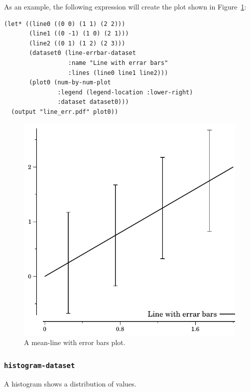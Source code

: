 \documentclass{article}
\begin{document}
As an example, the following expression will create the plot shown in
Figure~\ref{fig:line_err}:

\begin{verbatim}
(let* ((line0 ((0 0) (1 1) (2 2)))
       (line1 ((0 -1) (1 0) (2 1)))
       (line2 ((0 1) (1 2) (2 3)))
       (dataset0 (line-errbar-dataset
                  :name "Line with errar bars"
                  :lines (line0 line1 line2)))
       (plot0 (num-by-num-plot
               :legend (legend-location :lower-right)
               :dataset dataset0)))
  (output "line_err.pdf" plot0))
\end{verbatim}

\begin{figure}[t]
\begin{center}
\includegraphics{line_err}
\caption{\label{fig:line_err}A mean-line with error bars plot.}
\end{center}
\end{figure}

\subsubsection{\tt histogram-dataset}

A histogram shows a distribution of values.
\end{document}
